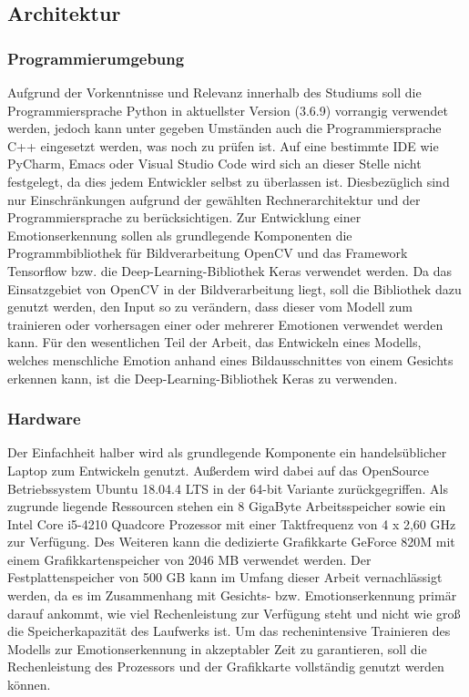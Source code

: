 \documentclass[12pt, a4paper]{scrbook}
\begin{document}
\subsection{Architektur}

\subsubsection{Programmierumgebung}
Aufgrund der Vorkenntnisse und Relevanz innerhalb des Studiums soll die Programmiersprache Python in aktuellster Version (3.6.9) vorrangig verwendet werden, jedoch kann unter gegeben Umständen auch die Programmiersprache C++ eingesetzt werden, was noch zu prüfen ist. Auf eine bestimmte IDE wie PyCharm, Emacs oder Visual Studio Code wird sich an dieser Stelle nicht festgelegt, da dies jedem Entwickler selbst zu überlassen ist. Diesbezüglich sind nur Einschränkungen aufgrund der gewählten Rechnerarchitektur und der Programmiersprache zu berücksichtigen.\newline
Zur Entwicklung einer Emotionserkennung sollen als grundlegende Komponenten die Programmbibliothek für Bildverarbeitung OpenCV und das Framework Tensorflow bzw. die Deep-Learning-Bibliothek Keras verwendet werden. Da das Einsatzgebiet von OpenCV in der Bildverarbeitung liegt, soll die Bibliothek dazu genutzt werden, den Input so zu verändern, dass dieser vom Modell zum trainieren oder vorhersagen einer oder mehrerer Emotionen verwendet werden kann. Für den wesentlichen Teil der Arbeit, das Entwickeln eines Modells, welches menschliche Emotion anhand eines Bildausschnittes von einem Gesichts erkennen kann, ist die Deep-Learning-Bibliothek Keras zu verwenden.

\subsubsection{Hardware}
Der Einfachheit halber wird als grundlegende Komponente ein handelsüblicher Laptop zum Entwickeln genutzt.  Außerdem wird dabei auf das OpenSource Betriebssystem Ubuntu 18.04.4 LTS in der 64-bit Variante zurückgegriffen. Als zugrunde liegende Ressourcen stehen ein 8 GigaByte Arbeitsspeicher sowie ein Intel Core i5-4210 Quadcore Prozessor mit einer Taktfrequenz von 4 x 2,60 GHz zur Verfügung. Des Weiteren kann die dedizierte Grafikkarte GeForce 820M mit einem Grafikkartenspeicher von 2046 MB verwendet werden. Der Festplattenspeicher von 500 GB kann im Umfang dieser Arbeit vernachlässigt werden, da es im Zusammenhang mit Gesichts- bzw. Emotionserkennung primär darauf ankommt, wie viel Rechenleistung zur Verfügung steht und nicht wie groß die Speicherkapazität des Laufwerks ist. Um das rechenintensive Trainieren des Modells zur Emotionserkennung in akzeptabler Zeit zu garantieren, soll die Rechenleistung des Prozessors und der Grafikkarte vollständig genutzt werden können.
\end{document}
